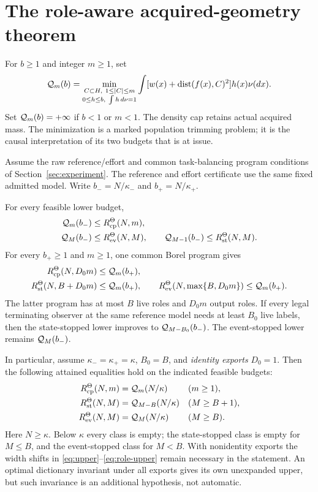 \section{The role-aware acquired-geometry theorem}
For $b\ge1$ and integer $m\ge1$, set
\begin{equation}\label{eq:profile}
 \mathcal Q_m(b)=\min_{\substack{C\subset H,\ 1\le|C|\le m\\
                    0\le h\le b,\ \int h\,d\nu=1}}
             \int [w(x)+\operatorname{dist}(f(x),C)^2]h(x)\nu(dx).
\end{equation}
Set $\mathcal Q_m(b)=+\infty$ if $b<1$ or $m<1$. The density cap retains actual acquired mass. The minimization is a marked population trimming problem; it is the causal interpretation of its two budgets that is at issue.

\begin{theorem}\label{thm:main}
Assume the raw reference/effort and common task-balancing program conditions of Section~\ref{sec:experiment}. The reference and effort certificate use the same fixed admitted model. Write $b_-=N/\kappa_-$ and $b_+=N/\kappa_+$.

For every feasible lower budget,
\begin{align}
 \mathcal Q_m(b_-)&\le R_{\mathrm{cp}}^\Theta(N,m),\label{eq:cp-lower}\\
 \mathcal Q_M(b_-)&\le R_{\mathrm{ev}}^\Theta(N,M),\qquad
 \mathcal Q_{M-1}(b_-)\le R_{\mathrm{st}}^\Theta(N,M).\label{eq:aut-lower}
\end{align}
For every $b_+\ge1$ and $m\ge1$, one common Borel program gives
\begin{align}
 R_{\mathrm{cp}}^\Theta(N,D_0m)&\le\mathcal Q_m(b_+),\label{eq:upper}\\
 R_{\mathrm{st}}^\Theta(N,B+D_0m)&\le\mathcal Q_m(b_+),\qquad
 R_{\mathrm{ev}}^\Theta(N,\max\{B,D_0m\})\le\mathcal Q_m(b_+).\label{eq:role-upper}
\end{align}
The latter program has at most $B$ live roles and $D_0m$ output roles. If every legal terminating observer at the same reference model needs at least $B_0$ live labels, then the state-stopped lower improves to $\mathcal Q_{M-B_0}(b_-)$. The event-stopped lower remains $\mathcal Q_M(b_-)$.

In particular, assume $\kappa_- =\kappa_+=\kappa$, $B_0=B$, and \emph{identity exports} $D_0=1$. Then the following attained equalities hold on the indicated feasible budgets:
\begin{align}
 R_{\mathrm{cp}}^\Theta(N,m)&=\mathcal Q_m(N/\kappa) &&(m\ge1),\label{eq:exact-cp}\\
 R_{\mathrm{st}}^\Theta(N,M)&=\mathcal Q_{M-B}(N/\kappa) &&(M\ge B+1),\label{eq:exact-state}\\
 R_{\mathrm{ev}}^\Theta(N,M)&=\mathcal Q_M(N/\kappa) &&(M\ge B).\label{eq:exact-event}
\end{align}
Here $N\ge\kappa$. Below $\kappa$ every class is empty; the state-stopped class is empty for $M\le B$, and the event-stopped class for $M<B$. With nonidentity exports the width shifts in \eqref{eq:upper}--\eqref{eq:role-upper} remain necessary in the statement. An optimal dictionary invariant under all exports gives its own unexpanded upper, but such invariance is an additional hypothesis, not automatic.
\end{theorem}

